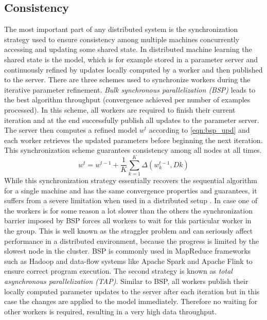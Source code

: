 \subsection{Consistency}
\label{ss:consistency}
The most important part of any distributed system is the synchronization strategy used to ensure consistency among multiple machines concurrently accessing and updating some shared state.
In distributed machine learning the shared state is the model, which is for example stored in a parameter server and continuously refined by updates locally computed by a worker and then published to the server.
There are three schemes used to synchronize workers during the iterative parameter refinement.
\textit{Bulk synchronous parallelization (BSP)} leads to the best algorithm throughput (convergence achieved per number of examples processed).
In this scheme, all workers are required to finish their current iteration and at the end successfully publish all updates to the parameter server.
The server then computes a refined model $w^t$ according to \ref{eqn:bsp_upd} and each worker retrieves the updated parameters before beginning the next iteration.
This synchronization scheme guarantees consistency among all nodes at all times.
\begin{equation}
w^{t} = w^{t-1} + \frac{1}{K}\sum_{k=1}^{K}\Delta(w^{t-1}_{k}, D{k})
\label{eqn:bsp_upd}
\end{equation}
While this synchronization strategy essentially recovers the sequential algorithm for a single machine and has the same convergence properties and guarantees, it suffers from a severe limitation when used in a distributed setup \cite{langford2009slow}.
In case one of the workers is for some reason a lot slower than the others the synchronization barrier imposed by BSP forces all workers to wait for this particular worker in the group.
This is well known as the straggler problem \cite{ananthanarayanan2013effective} and can seriously affect performance in a distributed environment, because the progress is limited by the slowest node in the cluster.
BSP is commonly used in MapReduce frameworks such as Hadoop and data-flow systems like Apache Spark and Apache Flink to ensure correct program execution.
The second strategy is known as \textit{total asynchronous parallelization (TAP)}.
Similar to BSP, all workers publish their locally computed parameter updates to the server after each iteration but in this case the changes are applied to the model immediately.
Therefore no waiting for other workers is required, resulting in a very high data throughput.
